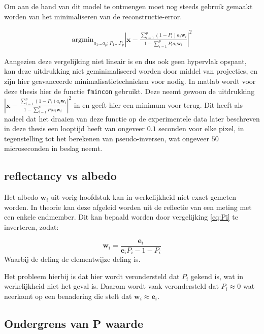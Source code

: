 \documentclass[12pt]{report}
\begin{document}
Om aan de hand van dit model te ontmengen moet nog steeds gebruik gemaakt worden van het minimaliseren van de reconstructie-error. 

\begin{align}
\text{argmin}_{a_1 ... a_p; P_1 ... P_p} \left| \bm{x} - \frac{\sum_{i=1}^p (1-P_i) a_{i} \bm{w}_{i}}{1-\sum_{i=1}^p P_i a_{i} \bm{w}_{i}} \right|^2
\end{align}

Aangezien deze vergelijking niet lineair is en dus ook geen hypervlak opspant, kan deze uitdrukking niet geminimaliseerd worden door middel van projecties, en zijn hier geavanceerde minimalisatietechnieken voor nodig. In matlab\cite{MATLAB} wordt voor deze thesis hier de functie \texttt{fmincon} gebruikt. Deze neemt gewoon de uitdrukking $\left| \bm{x} - \frac{\sum_{i=1}^p (1-P_i) a_{i} \bm{w}_{i}}{1-\sum_{i=1}^p P_i a_{i} \bm{w}_{i}} \right|^2$ in en geeft hier een minimum voor terug. Dit heeft als nadeel dat het draaien van deze functie op de experimentele data later beschreven in deze thesis een looptijd heeft van ongeveer $0.1$ seconden voor elke pixel, in tegenstelling tot het berekenen van pseudo-inversen, wat ongeveer $50$ microseconden in beslag neemt. 

\subsection{reflectancy vs albedo}

Het albedo  $\bm{w}_i$ uit vorig hoofdstuk kan in werkelijkheid niet exact gemeten worden. In theorie kan deze afgeleid worden uit de reflectie van een meting met een enkele endmember. Dit kan bepaald worden door vergelijking \ref{eq:Pi} te inverteren, zodat:

\begin{equation}
\bm{w}_i = \frac{\bm{e}_i}{\bm{e}_iP_i - 1 - P_i}
\end{equation}
Waarbij de deling de elementwijze deling is. 

Het probleem hierbij is dat hier wordt verondersteld dat $P_i$ gekend is, wat in werkelijkheid niet het geval is. Daarom wordt vaak verondersteld dat $P_i \approx 0$ wat neerkomt op een benadering die stelt dat $\bm{w}_i \approx \bm{e}_i$. 

\subsection{Ondergrens van P waarde}
\end{document}
